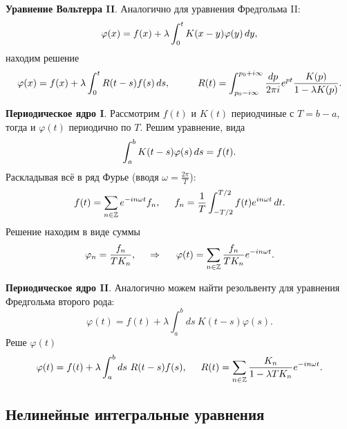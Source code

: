 \textbf{Уравнение Вольтерра II}.
Аналогично для уравнения Фредгольма II:
\begin{equation}
	\varphi(x) = f(x) + \lambda \int_{0}^{t} K(x-y) \varphi(y) \, d y,
\end{equation}
находим решение
\begin{equation*}
	\varphi(x) = f(x) + \lambda \int_{0}^{t} R(t-s) f(s) \d s,
	\hspace{10 mm} 
	R(t) = \int_{p_0 - i \infty}^{p_0 + i \infty} \frac{dp}{2\pi i} e^{pt} \frac{K(p)}{1-\lambda K(p)}.
\end{equation*}



\textbf{Периодическое ядро I}. Рассмотрим $f(t)$ и $K(t)$ периодчиные с $T = b-a$, тогда и $\varphi(t)$ периодично по $T$. Решим уравнение, вида
\begin{equation}
	\int_{a}^{b} K(t-s) \varphi(s) \, d s = f(t).
\end{equation}
Раскладывая всё в ряд Фурье (вводя $\omega = \frac{2\pi}{T}$):
\begin{equation*}
	f(t) = \sum_{n \in \mathbb{Z}} e^{-in \omega t} f_n,
	\hspace{5 mm} f_n = \frac{1}{T} \int_{-T/2}^{T/2} f(t) e^{i n \omega t} \, d t.
\end{equation*}
Решение находим в виде суммы
\begin{equation}
	\varphi_n = \frac{f_n}{T K_n},
	\hspace{0.5cm} \Rightarrow \hspace{0.5cm}
	\varphi(t) = \sum_{n \in \mathbb{Z}} \frac{f_n}{T K_n} e^{-i n \omega t}.
\end{equation}

\textbf{Периодическое ядро II}. Аналогично можем найти резольвенту для уравнения Фредгольма второго рода:
\begin{equation*}
	\varphi(t) = f(t) +  \lambda \int_{a}^{b} ds\ K(t-s) \varphi(s).
\end{equation*}
Реше $\varphi(t)$
\begin{equation}
	\varphi(t) = f(t) + \lambda \int_{a}^{b} ds\ R(t-s) f(s),
	\hspace{5 mm} 
	R(t) = \sum_{n \in \mathbb{Z}} \frac{K_n}{1-\lambda T K_n} e^{-i n \omega t}.
\end{equation}

\subsection*{Нелинейные интегральные уравнения}

